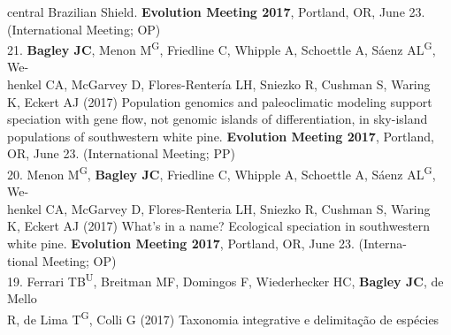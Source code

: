 \documentclass[margin,line]{res}
\begin{document}
\begin{resume}
\hspace*{8mm} central Brazilian Shield. \textbf{Evolution Meeting 2017}, Portland, OR, June 23.\\ \vspace{2mm}
\hspace*{8mm}(International Meeting; OP) \\
21. \textbf{Bagley JC}, Menon M\textsuperscript{G}, Friedline C, Whipple A, Schoettle A, S\'{a}enz AL\textsuperscript{G}, We-\\
\hspace*{8mm} henkel CA, McGarvey D, Flores-Renter\'{i}a LH, Sniezko R, Cushman S, Waring\\
\hspace*{8mm} K, Eckert AJ (2017) Population genomics and paleoclimatic modeling support\\
\hspace*{8mm} speciation with gene flow, not genomic islands of differentiation, in sky-island\\
\hspace*{8mm} populations of southwestern white pine. \textbf{Evolution Meeting 2017}, Portland,\\ \vspace{2mm}
\hspace*{8mm}OR, June 23. (International Meeting; PP) \\
20. Menon M\textsuperscript{G}, \textbf{Bagley JC}, Friedline C, Whipple A, Schoettle A, S\'{a}enz AL\textsuperscript{G}, We-\\
\hspace*{8mm} henkel CA, McGarvey D, Flores-Renteria LH, Sniezko R, Cushman S, Waring\\
\hspace*{8mm} K, Eckert AJ (2017) What's in a name? Ecological speciation in southwestern\\
\hspace*{8mm} white pine. \textbf{Evolution Meeting 2017}, Portland, OR, June 23. (Interna-\\ \vspace{2mm}
\hspace*{8mm}tional Meeting; OP) \\
19. Ferrari TB\textsuperscript{U}, Breitman MF, Domingos F, Wiederhecker HC, \textbf{Bagley JC}, de Mello\\
\hspace*{8mm} R, de Lima T\textsuperscript{G}, Colli G (2017) Taxonomia integrative e delimita\c{c}\~{a}o de esp\'{e}cies\\

\end{resume}
\end{document}
